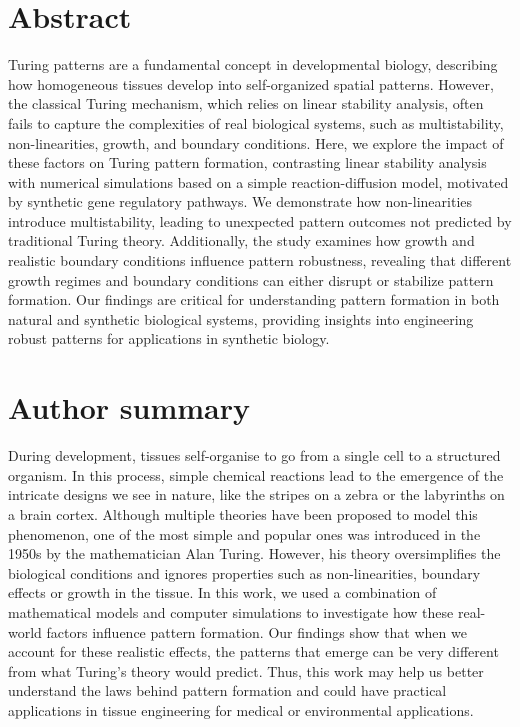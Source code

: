 \documentclass[10pt,letterpaper]{article}
\begin{document}
\section*{Abstract}
Turing patterns are a fundamental concept in developmental biology, describing how homogeneous tissues develop into self-organized spatial patterns. However, the classical Turing mechanism, which relies on linear stability analysis, often fails to capture the complexities of real biological systems, such as multistability, non-linearities, growth, and boundary conditions. Here, we explore the impact of these factors on Turing pattern formation, contrasting linear stability analysis with numerical simulations based on a simple reaction-diffusion model, motivated by synthetic gene regulatory pathways. We demonstrate how non-linearities introduce multistability, leading to unexpected pattern outcomes not predicted by traditional Turing theory. Additionally, the study examines how growth and realistic boundary conditions influence pattern robustness, revealing that different growth regimes and boundary conditions can either disrupt or stabilize pattern formation. Our findings are critical for understanding pattern formation in both natural and synthetic biological systems, providing insights into engineering robust patterns for applications in synthetic biology.


\section*{Author summary}
During development, tissues self-organise to go from a single cell to a structured organism. In this process, simple chemical reactions lead to the emergence of the intricate designs we see in nature, like the stripes on a zebra or the labyrinths on a brain cortex. Although multiple theories have been proposed to model this phenomenon, one of the most simple and popular ones was introduced in the 1950s by the mathematician Alan Turing. However, his theory oversimplifies the biological conditions and ignores properties such as non-linearities, boundary effects or growth in the tissue. In this work, we used a combination of mathematical models and computer simulations to investigate how these real-world factors influence pattern formation. Our findings show that when we account for these realistic effects, the patterns that emerge can be very different from what Turing's theory would predict. Thus, this work may help us better understand the laws behind pattern formation and could have practical applications in tissue engineering for medical or environmental applications. 
\end{document}
